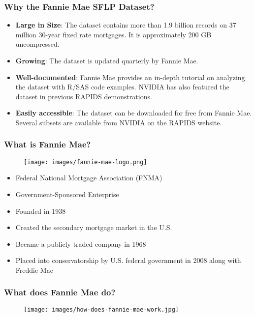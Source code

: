\documentclass{beamer}
\begin{document}
\begin{frame}
   \frametitle{Why the Fannie Mae SFLP Dataset?}
   \begin{itemize}\setlength\itemsep{1.5em}
      \item \textbf{Large in Size}: The dataset contains more than 1.9 
         billion records on 37 million 30-year fixed rate mortgages. It
         is approximately 200 GB uncompressed.
      \item \textbf{Growing}: The dataset is updated quarterly by Fannie Mae.
      \item \textbf{Well-documented}: Fannie Mae provides an in-depth tutorial
         on analyzing the dataset with R/SAS code examples. NVIDIA has 
         also featured the dataset in previous RAPIDS demonstrations.
      \item \textbf{Easily accessible}: The dataset can be downloaded for free
         from Fannie Mae. Several subsets are available from NVIDIA on 
         the RAPIDS website. 
   \end{itemize}
\end{frame}

\begin{frame}
   \frametitle{What is Fannie Mae?}
   \vspace{-1.0em}
   \begin{figure}[htbp]
      \texttt{[image: images/fannie-mae-logo.png]}
   \end{figure}
   \begin{itemize}\setlength\itemsep{1.0em}
      \item Federal National Mortgage Association (FNMA)
      \item Government-Sponsored Enterprise
      \item Founded in 1938
      \item Created the secondary mortgage market in the U.S.
      \item Became a publicly traded company in 1968
      \item Placed into conservatorship by U.S. federal government in 
            2008 along with Freddie Mac
   \end{itemize}
\end{frame}

\begin{frame}
   \frametitle{What does Fannie Mae do?}
   \begin{figure}[htbp]
      \texttt{[image: images/how-does-fannie-mae-work.jpg]}
   \end{figure}
\end{frame}
\end{document}

